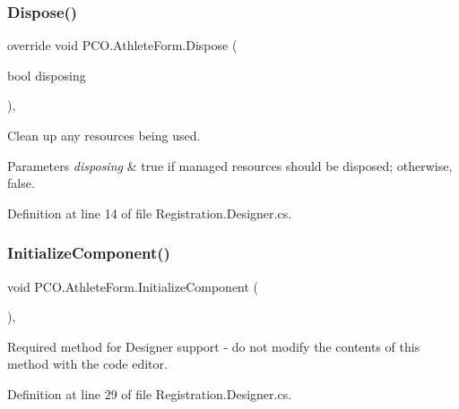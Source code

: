 \subsubsection{\texorpdfstring{Dispose()}{Dispose()}}
{\footnotesize\ttfamily override void P\+C\+O.\+Athlete\+Form.\+Dispose (\begin{DoxyParamCaption}\item[{bool}]{disposing }\end{DoxyParamCaption})\hspace{0.3cm}{\ttfamily [inline]}, {\ttfamily [protected]}}



Clean up any resources being used. 


\begin{DoxyParams}{Parameters}
{\em disposing} & true if managed resources should be disposed; otherwise, false.\\
\hline
\end{DoxyParams}


Definition at line 14 of file Registration.\+Designer.\+cs.

\mbox{\label{classPCO_1_1AthleteForm_a8d21033e36a776e7288a6fbb9be22d53}} 
\subsubsection{\texorpdfstring{Initialize\+Component()}{InitializeComponent()}}
{\footnotesize\ttfamily void P\+C\+O.\+Athlete\+Form.\+Initialize\+Component (\begin{DoxyParamCaption}{ }\end{DoxyParamCaption})\hspace{0.3cm}{\ttfamily [inline]}, {\ttfamily [private]}}



Required method for Designer support -\/ do not modify the contents of this method with the code editor. 



Definition at line 29 of file Registration.\+Designer.\+cs.

\mbox{\label{classPCO_1_1AthleteForm_a3d251648dacd89a7e2c5fffd83e1b08b}} 

